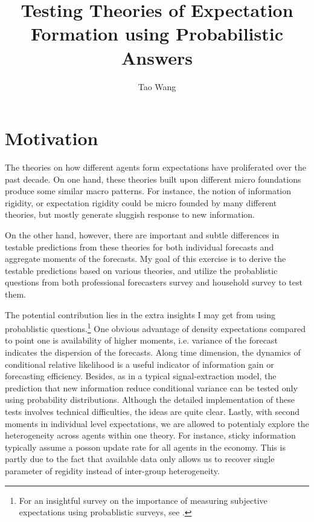 \documentclass[]{article}
\title{Testing Theories of Expectation Formation using Probabilistic Answers}
\author{Tao Wang}
\begin{document}
\maketitle

\section{Motivation}



The theories on how different agents form expectations have proliferated over the past decade. On one hand, these theories built upon different micro foundations produce some similar macro patterns. For instance, the notion of information rigidity, or expectation rigidity could be micro founded by many different theories, but mostly generate sluggish response to new information.  

On the other hand, however, there are important and subtle differences in testable predictions from these theories for both individual forecasts and aggregate moments of the forecasts. My goal of this exercise is to derive the testable predictions based on various theories, and utilize the probablistic questions from both professional forecasters survey and household survey to test them. 

The potential contribution lies in the extra insights I may get from using probablistic questions.\footnote{For an insightful survey on the importance of measuring subjective expectations using probablistic surveys, see \cite{manski2004measuring}.} One obvious advantage of density expectations compared to point one is availability of higher moments, i.e. variance of the forecast indicates the dispersion of the forecasts. Along time dimension, the dynamics of conditional relative likelihood is a useful indicator of information gain or forecasting efficiency. Besides, as in a typical signal-extraction model, the prediction that new information reduce conditional variance can be tested only using probability distributions. Although the detailed implementation of these tests involves technical difficulties, the ideas are quite clear.  Lastly, with second moments in individual level expectations, we are allowed to potentialy explore the heterogeneity across agents within one theory. For instance, sticky information typically assume a posson update rate for all agents in the economy. This is partly due to the fact that available data only allows us to recover single parameter of regidity instead of inter-group heterogeneity.  
\end{document}
